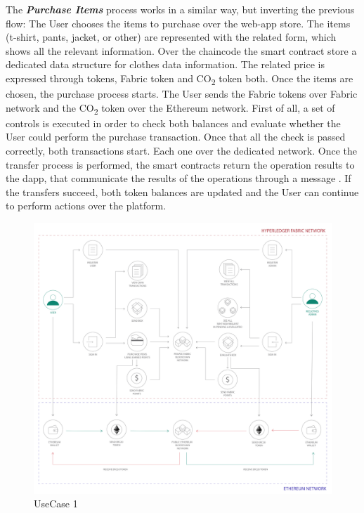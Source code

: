 \begin{outline}[enumerate]
    \1 The \textit{\bf{Purchase Items}} process works in a similar way, but inverting the previous flow:
    \2 The User chooses the items to purchase over the web-app store. The items (t-shirt, pants, jacket, or other) 
    are represented with the related form, which shows all the relevant information. Over the chaincode the smart 
    contract store a dedicated data structure for clothes data information. The related price is expressed through 
    tokens, Fabric token and CO\textsubscript{2} token both. 
    \2 Once the items are chosen, the purchase process starts. The User sends the Fabric tokens over Fabric network 
    and the CO\textsubscript{2} token over the Ethereum network. First of all, a set of controls is executed 
    in order to check both balances and evaluate whether the User could perform the purchase transaction. Once that all 
    the check is passed correctly, both transactions start.
    Each one over the dedicated network. Once the transfer process is performed, the smart contracts return the 
    operation results to the dapp, that communicate the results of the operations through a message .
    \2 If the transfers succeed, both token balances are updated and the User can
    continue to perform actions over the platform.    
\end{outline}

\begin{figure}[h!]
	\centering
	\includegraphics[totalheight=15cm]{img/use_case1.png}
	\caption{UseCase 1}
	\label{fig:usecase1}
\end{figure}



